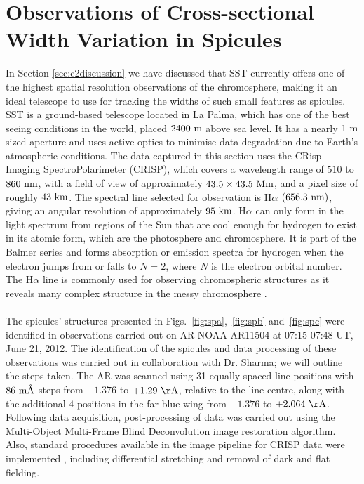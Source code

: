 \documentclass[12pt]{ociamthesis}
\newcommand{\np}{\\ \\}
\newcommand{\angstrom}{\textup{\AA}}
\begin{document}
\section{Observations of Cross-sectional Width Variation in Spicules}
\label{sec:CSW_spicules}
In Section \ref{sec:c2discussion} we have discussed that SST currently offers one of the highest spatial resolution observations of the chromosphere, making it an ideal telescope to use for tracking the widths of such small features as spicules. SST is a ground-based telescope located in La Palma, which has one of the best seeing conditions in the world, placed $2400~\rm{m}$ above sea level. It has a nearly $1~\rm{m}$ sized aperture and uses active optics to minimise data degradation due to Earth's atmospheric conditions. The data captured in this section uses the CRisp Imaging SpectroPolarimeter (CRISP), which covers a wavelength range of $510$ to $860~\rm{nm}$, with a field of view of approximately $43.5\times43.5~\rm{Mm}$, and a pixel size of roughly $43~\rm{km}$. The spectral line selected for observation is H$\alpha$ $(656.3~\rm{nm})$, giving an angular resolution of approximately $95~\rm{km}$. H$\alpha$ can only form in the light spectrum from regions of the Sun that are cool enough for hydrogen to exist in its atomic form, which are the photosphere and chromosphere. It is part of the Balmer series and forms absorption or emission spectra for hydrogen when the electron jumps from or falls to $N=2$, where $N$ is the electron orbital number. The H$\alpha$ line is commonly used for observing chromospheric structures as it reveals many complex structure in the messy chromosphere \citep{Parmenter1966PASP78250P, von1985AA146192V, Nishikawa1988PASJ40613N, Judge2006ASPC354259J, Leenaarts2007AA473625L, Rutten2008ASPC39754R, Jess2012, Pereira2016ApJ82465P, Rutten2017AA598A89R}. \np
The spicules' structures presented in Figs.~\ref{fig:spa},~\ref{fig:spb} and~\ref{fig:spc} were identified in observations carried out on AR NOAA AR11504 at 07:15-07:48 UT, June 21, 2012. The identification of the spicules and data processing of these observations was carried out in collaboration with Dr. Sharma; we will outline the steps taken. The AR was scanned using 31 equally spaced line positions with $86~\rm{m\angstrom}$ steps from $-1.376$ to $+1.29~\rm{\AA}$, relative to the line centre, along with the additional $4$ positions in the far blue wing from $-1.376$ to $+2.064~\rm{\AA}$. Following data acquisition, post-processing of data was carried out using the Multi-Object Multi-Frame Blind Deconvolution \citep[MOMFBD;][]{2005} image restoration algorithm. Also, standard procedures available in the image pipeline for CRISP data were implemented \citep{2015}, including differential stretching and removal of dark and flat fielding. \np
\end{document}
